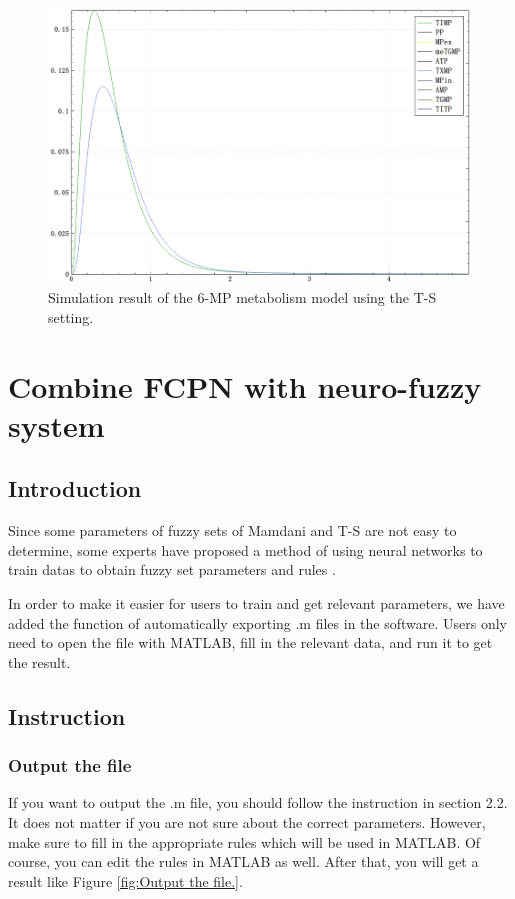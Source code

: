 \documentclass[journal,a4paper,onecolumn]{article}
\begin{document}
\begin{figure}[!hbt]
	\begin{center}
		\includegraphics[width=\columnwidth]{fig56}
		\caption{Simulation result of the 6-MP metabolism model using the T-S setting.}
		\label{fig:Simulation result of 6-MP metabolism using T-S.}
	\end{center}
\end{figure}


\clearpage


\section{Combine FCPN with neuro-fuzzy system}
\subsection{Introduction}
Since some parameters of fuzzy sets of Mamdani and T-S are not easy to determine, some experts have proposed a method of using neural networks to train datas to obtain fuzzy set parameters and rules \cite{jang1993anfis}\cite{Xiao2015Research}.

In order to make it easier for users to train and get relevant parameters, we have added the function of automatically exporting .m files in the software. Users only need to open the file with MATLAB, fill in the relevant data, and run it to get the result.
\subsection{Instruction}
\subsubsection{Output the file}
If you want to output the .m file, you should follow the instruction in section 2.2. It does not matter if you are not sure about the correct parameters. However, make sure to fill in the appropriate rules which will be used in MATLAB. Of course, you can edit the rules in MATLAB as well. After that, you will get a result like Figure \ref{fig:Output the file.}.
\end{document}
